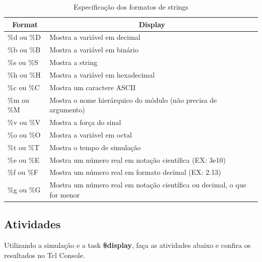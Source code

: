 \documentclass[a4paper]{article}
\begin{document}
\begin{table}[H]
\caption{Especificação dos formatos de strings}
\begin{tabular}{@{}ll@{}}
\toprule
\multicolumn{1}{c}{Format} & \multicolumn{1}{c}{Display}                                             \\ \midrule
\%d ou \%D                 & Mostra a variável em decimal                                            \\
\%b ou \%B                 & Mostra a variável em binário                                            \\
\%s ou \%S                 & Mostra a string                                                         \\
\%h ou \%H                 & Mostra a variável em hexadecimal                                        \\
\%c ou \%C                 & Mostra um caractere ASCII                                               \\
\%m ou \%M                 & Mostra o nome hierárquico do módulo (não precisa de argumento)          \\
\%v ou \%V                 & Mostra a força do sinal                                                 \\
\%o ou \%O                 & Mostra a variável em octal                                              \\
\%t ou \%T                 & Mostra o tempo de simulação                                             \\
\%e ou \%E                 & Mostra um número real em notação científica (EX: 3e10)                  \\
\%f ou \%F                 & Mostra um número real em formato decimal (EX: 2.13)                     \\
\%g ou \%G                 & Mostra um número real em notação científica ou decimal, o que for menor \\ \bottomrule
\end{tabular}
\end{table}

\newpage

\subsection*{Atividades}
Utilizando a simulação e a task \textbf{\$display}, faça as atividades abaixo e confira os resultados no Tcl Console.
\end{document}
